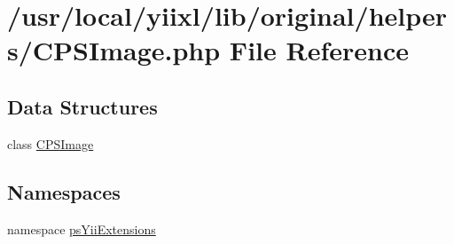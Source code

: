\hypertarget{CPSImage_8php}{
\section{/usr/local/yiixl/lib/original/helpers/CPSImage.php File Reference}
\label{CPSImage_8php}
}
\subsection*{Data Structures}
\begin{DoxyCompactItemize}
\item 
class \hyperlink{classCPSImage}{CPSImage}
\end{DoxyCompactItemize}
\subsection*{Namespaces}
\begin{DoxyCompactItemize}
\item 
namespace \hyperlink{namespacepsYiiExtensions}{psYiiExtensions}
\end{DoxyCompactItemize}

